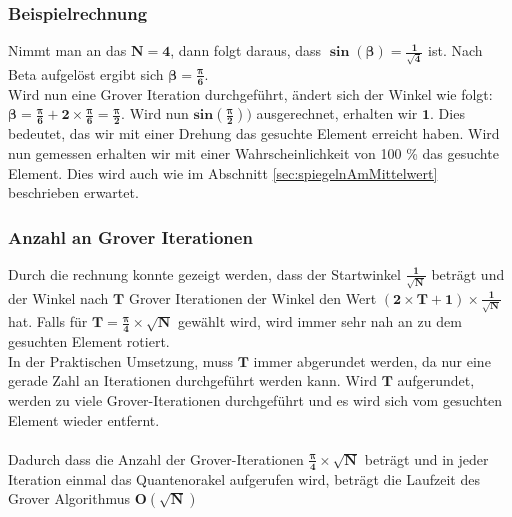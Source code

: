\subsubsection{Beispielrechnung}
Nimmt man an das $\mathbf{N=4}$, dann folgt daraus, dass $\mathbf{\sin(\beta) = \frac{1}{\sqrt{4}}}$ ist. Nach Beta aufgelöst ergibt sich $\mathbf{\beta = \frac{\pi}{6}}$.
\\
Wird nun eine Grover Iteration durchgeführt, ändert sich der Winkel wie folgt: $\mathbf{\beta = \frac{\pi}{6} + 2 \times \frac{\pi}{6}  = \frac{\pi}{2}}$. Wird nun $\mathbf{sin(\frac{\pi}{2}))}$ ausgerechnet, erhalten wir $\mathbf{1}$. Dies bedeutet, das wir mit einer Drehung das gesuchte Element erreicht haben. Wird nun gemessen erhalten wir mit einer Wahrscheinlichkeit von 100 \% das gesuchte Element. Dies wird auch wie im Abschnitt  \ref{sec:spiegelnAmMittelwert}  beschrieben erwartet.

\subsubsection{Anzahl an Grover Iterationen}
Durch die rechnung konnte gezeigt werden, dass der Startwinkel $\mathbf{\frac{1}{\sqrt{N}}}$ beträgt und der Winkel nach $\mathbf{T}$ Grover Iterationen der Winkel den Wert $\mathbf{(2 \times T + 1)\times \frac{1}{\sqrt{N}}}$ hat. 
Falls für $\mathbf{T = \frac{\pi}{4}\times \sqrt{N}}$ gewählt wird, wird immer sehr nah an zu dem gesuchten Element rotiert. 
\\
In der Praktischen Umsetzung, muss $\mathbf{T}$ immer abgerundet werden, da nur eine gerade Zahl an Iterationen durchgeführt werden kann. Wird $\mathbf{T}$ aufgerundet, werden zu viele Grover-Iterationen durchgeführt und es wird sich vom gesuchten Element wieder entfernt.
\\
\\
Dadurch dass die Anzahl der Grover-Iterationen $\mathbf{ \frac{\pi}{4}\times \sqrt{N}}$ beträgt und in jeder Iteration einmal das Quantenorakel aufgerufen wird, beträgt die Laufzeit des Grover Algorithmus $\mathbf{O(\sqrt N)}$
